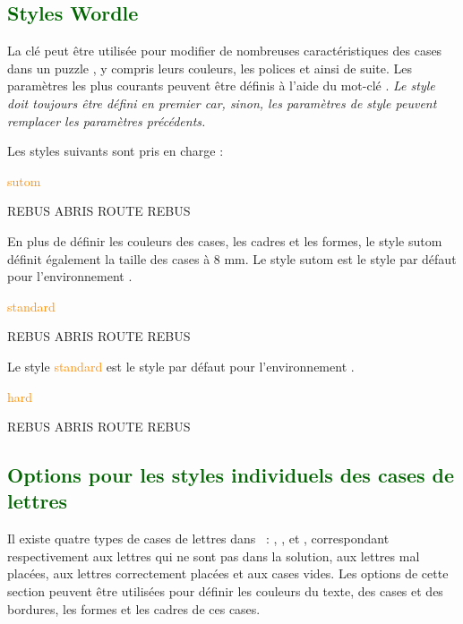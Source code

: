 \documentclass[svgnames]{report}
\newcommand\Section[1]{\subsection{\textcolor{DarkGreen}{#1}}}
\begin{document}
  \Section{Styles Wordle}

  La clé  peut être utilisée pour modifier de nombreuses caractéristiques des cases dans un puzzle , y compris leurs couleurs, les polices et ainsi de suite. Les paramètres les plus courants peuvent être définis à l'aide du mot-clé . \textit{Le style doit toujours être défini en premier car, sinon, les paramètres de style peuvent remplacer les paramètres précédents.}
  
  Les styles suivants sont pris en charge : 

  \textcolor{DarkOrange}{sutom}

  \begin{example}
  \begin{wordle}[Style=sutom]{REBUS}
    ABRIS
    ROUTE
    REBUS
  \end{wordle}
  \end{example}

  En plus de définir les couleurs des cases, les cadres et les formes, le style \textsf{sutom} définit également la taille des cases à 8 mm. Le style \textsf{sutom} est le style par défaut pour l'environnement .
  
  \textcolor{DarkOrange}{standard}

  \begin{example}
  \begin{wordle}[Style=standard]{REBUS}
    ABRIS
    ROUTE
    REBUS
  \end{wordle}
  \end{example}

  Le style \textcolor{DarkOrange}{standard} est le style par défaut pour l'environnement .

  \textcolor{DarkOrange}{hard}

  \begin{example}
  \begin{wordle}[Style=hard]{REBUS}
    ABRIS
    ROUTE
    REBUS
  \end{wordle}
  \end{example}

  \Section{Options pour les styles individuels des cases de lettres}
  
  Il existe quatre types de cases de lettres dans  :
  , ,  et
  , correspondant respectivement aux lettres qui ne sont pas dans la solution,
  aux lettres mal placées, aux lettres correctement placées et aux cases vides. Les options de cette section peuvent être utilisées pour
  définir les couleurs du texte, des cases et des bordures, les formes et les cadres de ces cases.
  
\end{document}
